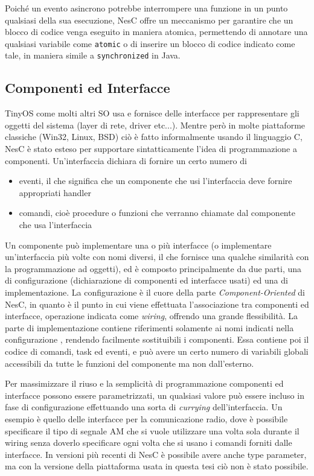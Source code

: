 \documentclass[twoside,11pt,a4paper,italian,openany]{book}
\begin{document}
Poiché un evento asincrono potrebbe interrompere una funzione in un punto qualsiasi della sua esecuzione, NesC offre un meccanismo per garantire che un blocco di codice venga eseguito in 
maniera atomica,  permettendo di annotare una qualsiasi variabile come \texttt{atomic} o 
di inserire un blocco di codice indicato come tale, in maniera simile a \texttt{synchronized} 
in Java.


 

\subsection{Componenti ed Interfacce}
TinyOS come molti altri SO usa e fornisce delle interfacce per rappresentare gli oggetti del 
sistema (layer di rete, driver etc...). 
Mentre però in molte piattaforme classiche (Win32, Linux, BSD) ciò è fatto informalmente 
usando il linguaggio C, NesC è stato esteso per supportare sintatticamente l'idea di 
programmazione a componenti. 
Un'interfaccia dichiara di fornire un certo numero di 
\begin{itemize}

\item{eventi, il che significa che un componente che usi l'interfaccia deve fornire appropriati
handler} 

\item{comandi, cioè procedure o funzioni che verranno chiamate dal componente che usa l'interfaccia}
\end{itemize}

Un componente può implementare una o più interfacce (o implementare un'interfaccia più volte 
con nomi diversi, il che fornisce una qualche similarità con la programmazione ad oggetti), 
ed è composto principalmente da due parti, una di configurazione 
(dichiarazione di componenti ed interfacce usati) ed una di implementazione.
La configurazione è il cuore della parte \emph{Component-Oriented} di NesC, in quanto è 
il punto in cui viene effettuata l'associazione tra componenti ed interfacce, operazione indicata
 come \emph{wiring}, offrendo una grande flessibilità. 
La parte di implementazione contiene riferimenti solamente ai nomi indicati nella configurazione
, rendendo facilmente sostituibili i componenti.
Essa contiene poi il codice di comandi, task ed eventi, e può avere un 
certo numero di variabili globali accessibili da tutte le funzioni del componente ma non 
dall'esterno. 

Per massimizzare il riuso e la semplicità di programmazione componenti ed interfacce possono 
essere parametrizzati, un qualsiasi valore può essere 
incluso in fase di configurazione effettuando una sorta di \emph{currying} dell'interfaccia. 
Un esempio è quello delle interfacce per la comunicazione radio, dove è possibile specificare 
il tipo di segnale AM che si vuole utilizzare una volta sola durante il wiring senza doverlo specificare ogni volta che si usano i comandi forniti dalle interfacce. 
In versioni più recenti di NesC è possibile avere anche type parameter, ma con la versione della piattaforma usata in questa tesi ciò non è stato possibile. 
\end{document}
